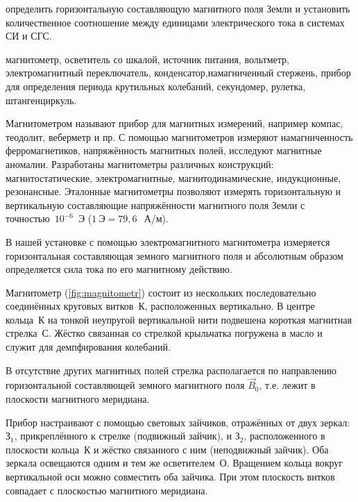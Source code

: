 
\begin{lab:aim}
	определить горизонтальную составляющую магнитного поля Земли и установить количественное соотношение между единицами электрического тока в системах СИ и СГС.
\end{lab:aim}

\begin{lab:equipment}
	магнитометр, осветитель со шкалой, источник питания, вольтметр, электромагнитный переключатель, конденсатор,намагниченный стержень, прибор для определения периода крутильных колебаний, секундомер, рулетка, штангенциркуль.
\end{lab:equipment}


Магнитометром называют прибор для магнитных измерений, например компас, теодолит, веберметр и пр. С помощью
магнитометров измеряют намагниченность ферромагнетиков, напряжённость магнитных полей, исследуют магнитные аномалии.
Разработаны магнитометры различных конструкций: магнитостатические, электромагнитные, магнитодинамические, индукционные,
резонансные. Эталонные магнитометры позволяют измерять горизонтальную и вертикальную составляющие напряжённости
магнитного поля Земли с точностью~$10^{-6}$~Э ($1~Э=79,6~$~А/м).


В нашей установке с помощью электромагнитного магнитометра измеряется горизонтальная составляющая земного магнитного
поля и абсолютным образом определяется сила тока по его магнитному действию.

\experiment Магнитометр (\ref{fig:magnitometr}) состоит из нескольких последовательно соединённых круговых витков~К, расположенных
вертикально. В центре кольца~К на тонкой неупругой вертикальной нити подвешена короткая магнитная стрелка~С. Жёстко
связанная со стрелкой крыльчатка погружена в масло и служит для демпфирования колебаний.

В отсутствие других магнитных полей стрелка располагается по направлению горизонтальной составляющей земного магнитного
поля $\vec{B}_0$, т.е. лежит в плоскости магнитного меридиана.

Прибор настраивают с помощью световых зайчиков, отражённых от двух зеркал: $З_1$, прикреплённого к стрелке (подвижный
зайчик), и $З_2$, расположенного в плоскости кольца~К и жёстко связанного с ним (неподвижный зайчик). Оба зеркала
освещаются одним и тем же осветителем~О. Вращением кольца вокруг вертикальной оси можно совместить оба зайчика. При этом
плоскость витков совпадает с плоскостью магнитного меридиана.

